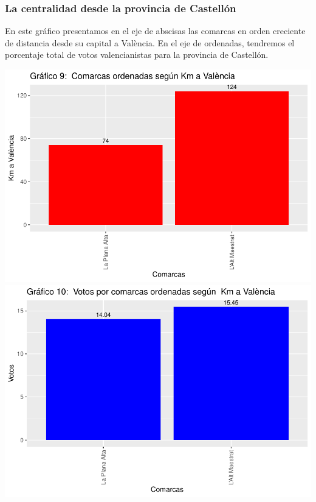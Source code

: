 \documentclass[
]{article}
\begin{document}
\hypertarget{la-centralidad-desde-la-provincia-de-castelluxf3n}{%
\subsubsection{La centralidad desde la provincia de
Castellón}\label{la-centralidad-desde-la-provincia-de-castelluxf3n}}

En este gráfico presentamos en el eje de abscisas las comarcas en orden
creciente de distancia desde su capital a València. En el eje de
ordenadas, tendremos el porcentaje total de votos valencianistas para la
provincia de Castellón.

\includegraphics{votovalencianista-ea2023_page_files/figure-latex/ordenDistanciacapitalCastellon-1.pdf}
\includegraphics{votovalencianista-ea2023_page_files/figure-latex/ordenDistanciacapitalCastellon-2.pdf}
\end{document}
